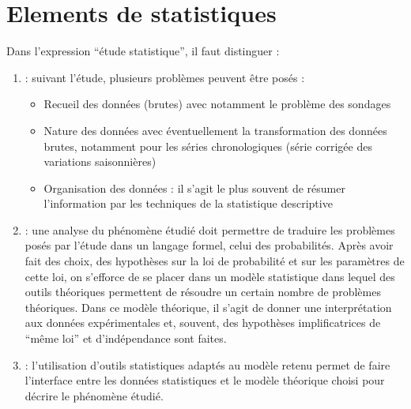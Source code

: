 \documentclass[letterpaper,10pt,english]{jupyterBook}
\begin{document}
\chapter{Elements de statistiques}
\label{\detokenize{elemstats:elements-de-statistiques}}\label{\detokenize{elemstats::doc}}
\sphinxAtStartPar
Dans l’expression “étude statistique”, il faut distinguer :
\begin{enumerate}
%
\item {} 
\sphinxAtStartPar
{} : suivant l’étude, plusieurs problèmes peuvent être posés :
\begin{itemize}
\item {} 
\sphinxAtStartPar
Recueil des données (brutes) avec notamment le problème des sondages

\item {} 
\sphinxAtStartPar
Nature des données avec éventuellement la transformation des données brutes, notamment pour les séries chronologiques (série corrigée des variations saisonnières)

\item {} 
\sphinxAtStartPar
Organisation des données : il s’agit le plus souvent de résumer l’information par les techniques de la statistique descriptive

\end{itemize}

\item {} 
\sphinxAtStartPar
{} : une analyse du phénomène étudié doit permettre de traduire les problèmes posés par l’étude dans un langage formel, celui des probabilités. Après avoir fait des choix, des hypothèses sur la loi de probabilité et sur les paramètres de cette loi, on s’efforce de se placer dans un modèle statistique dans lequel des outils théoriques permettent de résoudre un certain nombre de problèmes théoriques. Dans ce modèle théorique, il s’agit de donner une interprétation aux données expérimentales et, souvent, des hypothèses implificatrices de “même loi” et d’indépendance sont faites.

\item {} 
\sphinxAtStartPar
{} : l’utilisation d’outils statistiques adaptés au modèle retenu permet de faire l’interface entre les données statistiques et le modèle théorique choisi pour décrire le phénomène étudié.

\end{enumerate}
\end{document}
